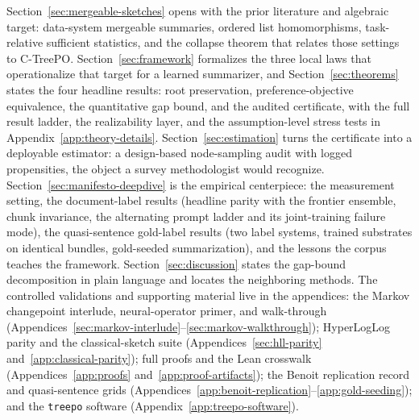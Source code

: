 Section~\ref{sec:mergeable-sketches} opens with the prior literature and algebraic target: data-system mergeable summaries, ordered list homomorphisms, task-relative sufficient statistics, and the collapse theorem that relates those settings to C-TreePO. Section~\ref{sec:framework} formalizes the three local laws that operationalize that target for a learned summarizer, and Section~\ref{sec:theorems} states the four headline results: root preservation, preference-objective equivalence, the quantitative gap bound, and the audited certificate, with the full result ladder, the realizability layer, and the assumption-level stress tests in Appendix~\ref{app:theory-details}. Section~\ref{sec:estimation} turns the certificate into a deployable estimator: a design-based node-sampling audit with logged propensities, the object a survey methodologist would recognize. Section~\ref{sec:manifesto-deepdive} is the empirical centerpiece: the measurement setting, the document-label results (headline parity with the frontier ensemble, chunk invariance, the alternating prompt ladder and its joint-training failure mode), the quasi-sentence gold-label results (two label systems, trained substrates on identical bundles, gold-seeded summarization), and the lessons the corpus teaches the framework. Section~\ref{sec:discussion} states the gap-bound decomposition in plain language and locates the neighboring methods. The controlled validations and supporting material live in the appendices: the Markov changepoint interlude, neural-operator primer, and walk-through (Appendices~\ref{sec:markov-interlude}--\ref{sec:markov-walkthrough}); HyperLogLog parity and the classical-sketch suite (Appendices~\ref{sec:hll-parity} and~\ref{app:classical-parity}); full proofs and the Lean crosswalk (Appendices~\ref{app:proofs} and~\ref{app:proof-artifacts}); the Benoit replication record and quasi-sentence grids (Appendices~\ref{app:benoit-replication}--\ref{app:gold-seeding}); and the \texttt{treepo} software (Appendix~\ref{app:treepo-software}).
